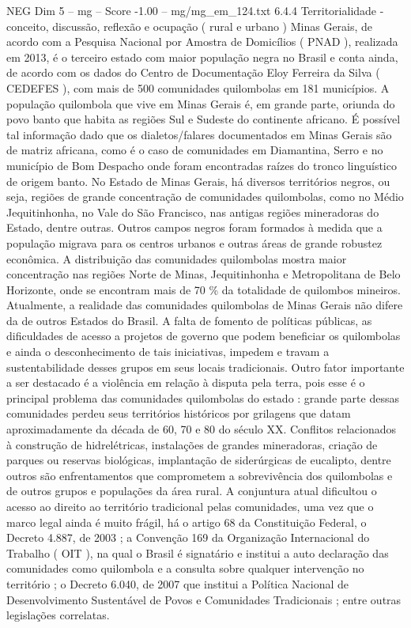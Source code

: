 \begin{textsample}{NEG Dim 5 – mg – Score -1.00 – mg/mg\_em\_124.txt}  \label{ex:f5_neg_107}
6.4.4 Territorialidade - conceito, discussão, reflexão e ocupação ( rural e urbano ) Minas Gerais, de acordo com a Pesquisa Nacional por Amostra de Domicílios ( PNAD ), realizada em 2013, é o terceiro estado com maior população negra no Brasil e conta ainda, de acordo com os dados do Centro de Documentação Eloy Ferreira da Silva ( CEDEFES ), com mais de 500 comunidades quilombolas em 181 municípios.
A população quilombola que vive em Minas Gerais é, em grande parte, oriunda do povo banto que habita as regiões Sul e Sudeste do continente africano.
É possível tal informação dado que os dialetos/falares documentados em Minas Gerais são de matriz africana, como é o caso de comunidades em Diamantina, Serro e no município de Bom Despacho onde foram encontradas raízes do tronco linguístico de origem banto.
No Estado de Minas Gerais, há diversos territórios negros, ou seja, regiões de grande concentração de comunidades quilombolas, como no Médio Jequitinhonha, no Vale do São Francisco, nas antigas regiões mineradoras do Estado, dentre outras.
Outros campos negros foram formados à medida que a população migrava para os centros urbanos e outras áreas de grande robustez econômica.
A distribuição das comunidades quilombolas mostra maior concentração nas regiões Norte de Minas, Jequitinhonha e Metropolitana de Belo Horizonte, onde se encontram mais de 70 \% da totalidade de quilombos mineiros.
Atualmente, a realidade das comunidades quilombolas de Minas Gerais não difere da de outros Estados do Brasil.
A falta de fomento de políticas públicas, as dificuldades de acesso a projetos de governo que podem beneficiar os quilombolas e ainda o desconhecimento de tais iniciativas, impedem e travam a sustentabilidade desses grupos em seus locais tradicionais.
Outro fator importante a ser destacado é a violência em relação à disputa pela terra, pois esse é o principal problema das comunidades quilombolas do estado : grande parte dessas comunidades perdeu seus territórios históricos por grilagens que datam aproximadamente da década de 60, 70 e 80 do século XX.
Conflitos relacionados à construção de hidrelétricas, instalações de grandes mineradoras, criação de parques ou reservas biológicas, implantação de siderúrgicas de eucalipto, dentre outros são enfrentamentos que comprometem a sobrevivência dos quilombolas e de outros grupos e populações da área rural.
A conjuntura atual dificultou o acesso ao direito ao território tradicional pelas comunidades, uma vez que o marco legal ainda é muito frágil, há o artigo 68 da Constituição Federal, o Decreto 4.887, de 2003 ; a Convenção 169 da Organização Internacional do Trabalho ( OIT ), na qual o Brasil é signatário e institui a auto declaração das comunidades como quilombola e a consulta sobre qualquer intervenção no território ; o Decreto 6.040, de 2007 que institui a Política Nacional de Desenvolvimento Sustentável de Povos e Comunidades Tradicionais ; entre outras legislações correlatas.

\end{textsample}
